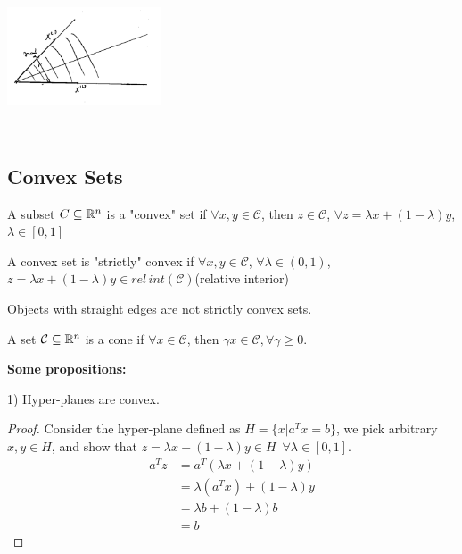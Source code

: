 \begin{marginfigure}
	\centering
	\includegraphics[width=1.8in,height=1.8in]{figures/ch08/figure1023_4.png}
\end{marginfigure}

\subsection{Convex Sets}

\begin{definition}
	A subset $C\subseteq \mathbb{R}^n$ is a "convex" set if $\forall x,y \in \mathcal{C}$, then $z\in \mathcal{C}$, $\forall z = \lambda x + (1-\lambda)y$, $\lambda \in [0,1]$
\end{definition}


\begin{definition}
	A convex set is "strictly" convex if $\forall x,y \in \mathcal{C}$, $\forall \lambda \in (0,1)$, $z = \lambda x + (1-\lambda)y \in rel\,int(\mathcal{C})$(relative interior)
\end{definition}

Objects with straight edges are not strictly convex sets.

\begin{definition}[Cone]
	A set $\mathcal{C}\subseteq \mathbb{R}^n $ is a cone if $\forall x\in \mathcal{C}$, then $\gamma x\in \mathcal{C}, \forall \gamma \geq 0$.
\end{definition}

\textbf{Some propositions:}

1) Hyper-planes are convex. 
\begin{proof}
Consider the hyper-plane defined as $H = \{x| a^Tx = b \}$, we pick arbitrary $x,y \in H$, and show that $z =\lambda x + (1-\lambda)y \in H$\ $\forall \lambda \in [0,1]$.
\begin{align*}
a^Tz &= a^T(\lambda x + (1-\lambda)y)\\
&= \lambda(a^Tx) + (1-\lambda)y\\
&= \lambda b + (1-\lambda)b\\
&= b
\end{align*}	
\end{proof}
	
